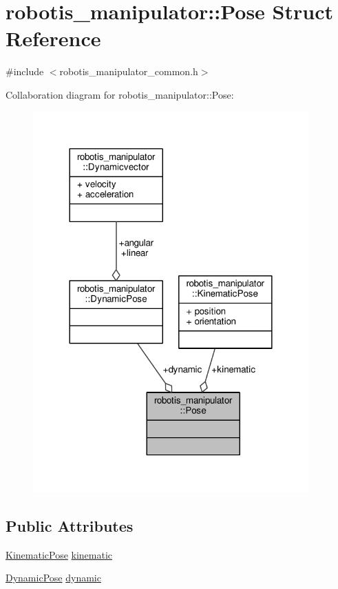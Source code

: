 \hypertarget{structrobotis__manipulator_1_1_pose}{}\section{robotis\+\_\+manipulator\+:\+:Pose Struct Reference}
\label{structrobotis__manipulator_1_1_pose}


{\ttfamily \#include $<$robotis\+\_\+manipulator\+\_\+common.\+h$>$}



Collaboration diagram for robotis\+\_\+manipulator\+:\+:Pose\+:\nopagebreak
\begin{figure}[H]
\begin{center}
\leavevmode
\includegraphics[width=300pt]{structrobotis__manipulator_1_1_pose__coll__graph}
\end{center}
\end{figure}
\subsection*{Public Attributes}
\begin{DoxyCompactItemize}
\item 
\hyperlink{structrobotis__manipulator_1_1_kinematic_pose}{Kinematic\+Pose} \hyperlink{structrobotis__manipulator_1_1_pose_a7215a37d50e62643f1523d3fa40a36e9}{kinematic}
\item 
\hyperlink{structrobotis__manipulator_1_1_dynamic_pose}{Dynamic\+Pose} \hyperlink{structrobotis__manipulator_1_1_pose_a8accf10d21933e07ade2728fcccf4ae6}{dynamic}
\end{DoxyCompactItemize}


